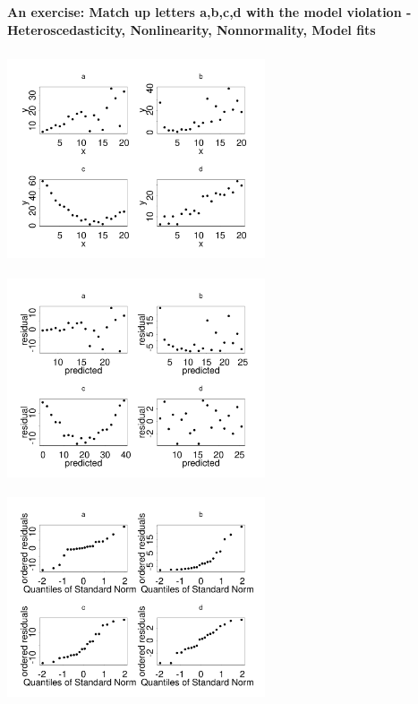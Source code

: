 \textbf{An exercise: Match up letters a,b,c,d with the model violation - Heteroscedasticity, Nonlinearity, Nonnormality, Model fits}
\begin{center}
\includegraphics[height=2.5in,width=3in]{ybyx_handout.pdf}
\includegraphics[height=2.5in,width=3in]{resbypred_handout.pdf}
\includegraphics[height=2.5in,width=3in]{qqnorm_handout.pdf}
\end{center}



